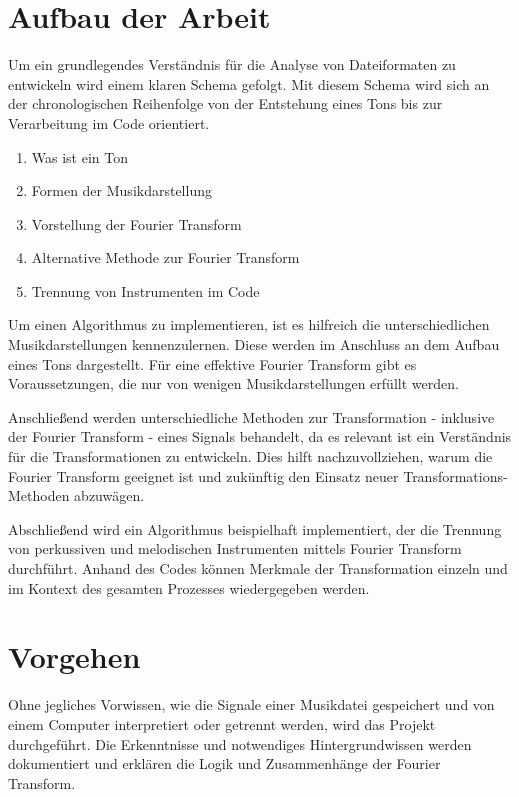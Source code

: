 %
\section{Aufbau der Arbeit}
%

Um ein grundlegendes Verständnis für die Analyse von Dateiformaten zu entwickeln wird einem klaren Schema gefolgt. Mit diesem Schema wird sich an der chronologischen Reihenfolge von der Entstehung eines Tons bis zur Verarbeitung im Code orientiert.

%
\begin{enumerate}
    \item Was ist ein Ton
    \item Formen der Musikdarstellung
    \item Vorstellung der Fourier Transform
    \item Alternative Methode zur Fourier Transform
    \item Trennung von Instrumenten im Code
\end{enumerate}
%

Um einen Algorithmus zu implementieren, ist es hilfreich die unterschiedlichen Musikdarstellungen kennenzulernen. Diese werden im Anschluss an dem Aufbau eines Tons dargestellt. Für eine effektive Fourier Transform gibt es Voraussetzungen, die nur von wenigen Musikdarstellungen erfüllt werden.

\par

Anschließend werden unterschiedliche Methoden zur Transformation - inklusive der Fourier Transform - eines Signals behandelt, da es relevant ist ein Verständnis für die Transformationen zu entwickeln. Dies hilft nachzuvollziehen, warum die Fourier Transform geeignet ist und zukünftig den Einsatz neuer Transformations-Methoden abzuwägen.

\par

Abschließend wird ein Algorithmus beispielhaft implementiert, der die Trennung von perkussiven und melodischen Instrumenten mittels Fourier Transform durchführt. Anhand des Codes können Merkmale der Transformation einzeln und im Kontext des gesamten Prozesses wiedergegeben werden.

%
\section{Vorgehen}
%

Ohne jegliches Vorwissen, wie die Signale einer Musikdatei gespeichert und von einem Computer interpretiert oder getrennt werden, wird das Projekt durchgeführt. Die Erkenntnisse und notwendiges Hintergrundwissen werden dokumentiert und erklären die Logik und Zusammenhänge der Fourier Transform. 


